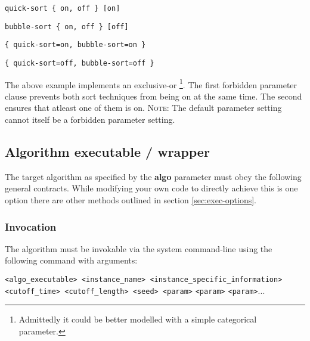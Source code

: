 \documentclass[manual.tex]{subfiles}
\begin{document}
\texttt{quick-sort~\{~on,~off~\}~{[}on{]}}

\texttt{bubble-sort~\{~on,~off~\}~{[}off{]}}

\texttt{\{~quick-sort=on,~bubble-sort=on~\}}

\texttt{\{~quick-sort=off,~bubble-sort=off~\}}

The above example implements an exclusive-or \footnote{Admittedly it could be
better modelled with a simple categorical parameter.}. The first forbidden parameter clause prevents both sort techniques from being on at the same time. The second ensures that atleast one of them is on. \textsc{Note:} The default parameter setting cannot itself be a forbidden parameter setting.

\subsection{Algorithm executable / wrapper}

\label{sec:exec-spec} The target algorithm as specified by the \textbf{algo} parameter must obey the following general contracts. While modifying your own code to directly achieve this is one option there are other methods outlined in section \ref{sec:exec-options}.

\subsubsection{Invocation}

The algorithm must be invokable via the system command-line using the following command with arguments:

\texttt{<algo\_executable> <instance\_name> <instance\_specific\_information>
<cutoff\_time> <cutoff\_length> <seed> <param>} \texttt{<param>} \texttt{<param>}...
\end{document}
